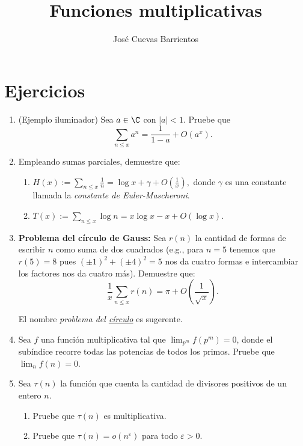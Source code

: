 \documentclass[11pt, reqno]{amsart}
\title{Funciones multiplicativas}
\date{\DTMdate{2025-09-04}}
\author[José Cuevas]{José Cuevas Barrientos}
\begin{document}
\maketitle

\section{Ejercicios}
\begin{enumerate}
	\item (Ejemplo iluminador)
		Sea $a \in \C$ con $|a| < 1$.
		Pruebe que
		\[
			\sum_{n\le x} a^n = \frac{1}{1 - a} + O(a^x).
		\]

		\newex
	\item Empleando sumas parciales, demuestre que:
		\begin{enumerate}
			\item $\displaystyle H(x) := \sum_{n \le x} \frac{1}{n} = \log x + \gamma + O\left( \frac{1}{x} \right),$ donde $ \gamma$ es una constante
				llamada la \textit{constante de Euler-Mascheroni}.
			\item $\displaystyle T(x) := \sum_{n \le x} \log n = x\log x - x + O(\log x)$.
		\end{enumerate}

		\newex
	\item \textbf{Problema del círculo de Gauss:} Sea $r(n)$ la cantidad de formas de escribir $n$ como suma de dos cuadrados
		(e.g., para $n = 5$ tenemos que $r(5) = 8$ pues $(\pm 1)^2 + (\pm 4)^2 = 5$ nos da cuatro formas e intercambiar
		los factores nos da cuatro más).
		Demuestre que:
		$$ \frac{1}{x} \sum_{n\le x} r(n) = \pi + O\left( \frac{1}{\sqrt{x}} \right). $$

		\begin{hint}
			El nombre \textit{problema del \underline{círculo}} es sugerente.
		\end{hint}

		\newex
	\item\lookright
		Sea $f$ una función multiplicativa tal que $\lim_{p^m} f(p^m) = 0$, donde el subíndice recorre todas las potencias de todos los primos.
		Pruebe que $\lim_n f(n) = 0$.

		\newex
	\item Sea $\tau(n)$ la función que cuenta la cantidad de divisores positivos de un entero $n$.
		\begin{enumerate}
			\item Pruebe que $\tau(n)$ es multiplicativa.
			\item Pruebe que $\tau(n) = o(n^\varepsilon)$ para todo $\varepsilon > 0$.
		\end{enumerate}

		\nocite{hua:number, tenenbaum:analytique}
\end{enumerate}

\begin{additional}
\printbibliography[title={Referencias y lecturas adicionales}]
\end{additional}
\end{document}
